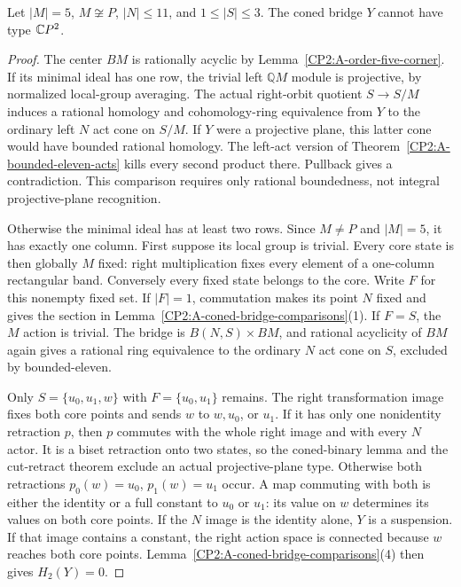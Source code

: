 \begin{proposition}
\label{CP2:A-coned-three-other-five}
Let $|M|=5$, $M\not\cong P$, $|N|\leq11$, and
$1\leq |S|\leq3$. The coned bridge $Y$ cannot have type
$\mathbb{C}P^2$.
\end{proposition}
\begin{proof}
The center $BM$ is rationally acyclic by
Lemma~\ref{CP2:A-order-five-corner}. If its minimal ideal
has one row, the trivial left $\mathbb QM$ module is
projective, by normalized local-group averaging. The actual
right-orbit quotient $S\to S/M$ induces a rational homology
and cohomology-ring equivalence from $Y$ to the ordinary
left $N$ act cone on $S/M$. If $Y$ were a projective plane,
this latter cone would have bounded rational homology.
The left-act version of Theorem~\ref{CP2:A-bounded-eleven-acts}
kills every second product there. Pullback gives a
contradiction. This comparison requires only rational
boundedness, not integral projective-plane recognition.

Otherwise the minimal ideal has at least two rows. Since
$M\ne P$ and $|M|=5$, it has exactly one column. First suppose
its local group is trivial. Every core state is then globally
$M$ fixed: right multiplication fixes every element of a
one-column rectangular band. Conversely every fixed state
belongs to the core. Write $F$ for this nonempty fixed set.
If $|F|=1$, commutation makes its point $N$ fixed and gives
the section in Lemma~\ref{CP2:A-coned-bridge-comparisons}(1).
If $F=S$, the $M$ action is trivial. The bridge is
$B(N,S)\times BM$, and rational acyclicity of $BM$ again
gives a rational ring equivalence to the ordinary $N$ act
cone on $S$, excluded by bounded-eleven.

Only $S=\{u_0,u_1,w\}$ with $F=\{u_0,u_1\}$ remains.
The right transformation image fixes both core points and
sends $w$ to $w,u_0$, or $u_1$. If it has only one
nonidentity retraction $p$, then $p$ commutes with the whole
right image and with every $N$ actor. It is a biset retraction
onto two states, so the coned-binary lemma and the cut-retract
theorem exclude an actual projective-plane type.
Otherwise both retractions $p_0(w)=u_0$, $p_1(w)=u_1$ occur.
A map commuting with both is either the identity or a full
constant to $u_0$ or $u_1$: its value on $w$ determines its
values on both core points. If the $N$ image is the identity
alone, $Y$ is a suspension. If that image contains a constant,
the right action space is connected because $w$ reaches both
core points. Lemma~\ref{CP2:A-coned-bridge-comparisons}(4)
then gives $H_2(Y)=0$.


\end{proof}
